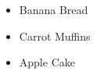 \documentclass{article}
\begin{document}
	
	\begin{itemize}
		\item Banana Bread
		\item Carrot Muffins
		\item Apple Cake
	\end{itemize}
	
\end{document}
